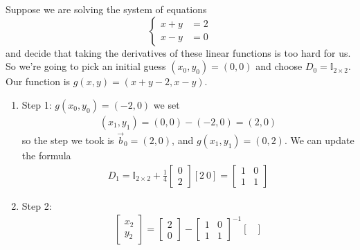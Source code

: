 \documentclass[11pt]{elegantbook}
\begin{document}
\begin{example}
Suppose we are solving the system of equations $$\left\{\begin{matrix}
    x+y&=2\\
    x-y&=0
\end{matrix}\right.$$ and decide that taking the derivatives of these linear functions is too hard for us. So we're going to pick an initial guess $(x_0,y_0) = (0,0)$ and choose $D_0=\mathbb{I}_{2\times 2}$. Our function is $g(x,y)=(x+y-2,x-y)$.
\begin{enumerate}
    \item Step 1: $g(x_0,y_0)=(-2,0)$ we set
    \begin{equation}
        \begin{aligned}
            (x_1,y_1)=(0,0)-(-2,0)=(2,0)
        \end{aligned}
        \nonumber
    \end{equation}
    so the step we took is $\vec{b}_0=(2,0)$, and $g(x_1,y_1)=(0,2)$. We can update the formula
    \begin{equation}
        \begin{aligned}
            D_1=\mathbb{I}_{2\times 2}+\frac{1}{4}\begin{bmatrix}
                0\\
                2
            \end{bmatrix}[2\ 0]=\begin{bmatrix}
                1&0\\
                1&1
            \end{bmatrix}
        \end{aligned}
        \nonumber
    \end{equation}
    \item Step 2:
    \begin{equation}
        \begin{aligned}
            \begin{bmatrix}
                x_2\\
                y_2
            \end{bmatrix}=\begin{bmatrix}
                2\\
                0
            \end{bmatrix}-\begin{bmatrix}
                1&0\\
                1&1
            \end{bmatrix}^{-1}\begin{bmatrix}

\end{bmatrix}
\end{aligned}
\end{equation}
\end{enumerate}
\end{example}
\end{document}
